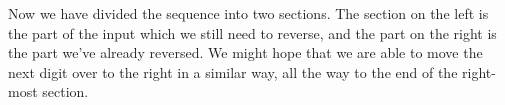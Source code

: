 \begin{center}
\end{center}

Now we have divided the sequence into two sections. The section on the left is the part of the input which we still need to reverse, and the part on the right is the part we've already reversed. We might hope that we are able to move the next digit over to the right in a similar way, all the way to the end of the right-most section.

